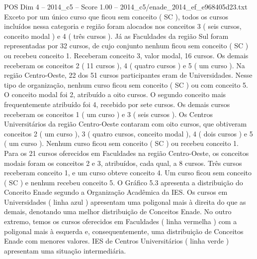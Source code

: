 \begin{textsample}{POS Dim 4 – 2014\_c5 – Score 1.00 – 2014\_c5/enade\_2014\_ef\_e968405d23.txt}
Exceto por um único curso que ficou sem conceito ( SC ), todos os cursos incluídos nessa categoria e região foram alocados nos conceitos 3 ( seis cursos, conceito modal ) e 4 ( três cursos ).
Já as Faculdades da região Sul foram representadas por 32 cursos, de cujo conjunto nenhum ficou sem conceito ( SC ) ou recebeu conceito 1.
Receberam conceito 3, valor modal, 16 cursos.
Os demais receberam os conceitos 2 ( 11 cursos ), 4 ( quatro cursos ) e 5 ( um curso ).
Na região Centro-Oeste, 22 dos 51 cursos participantes eram de Universidades.
Nesse tipo de organização, nenhum curso ficou sem conceito ( SC ) ou com conceito 5.
O conceito modal foi 2, atribuído a oito cursos.
O segundo conceito mais frequentemente atribuído foi 4, recebido por sete cursos.
Os demais cursos receberam os conceitos 1 ( um curso ) e 3 ( seis cursos ).
Os Centros Universitários da região Centro-Oeste contaram com oito cursos, que obtiveram conceitos 2 ( um curso ), 3 ( quatro cursos, conceito modal ), 4 ( dois cursos ) e 5 ( um curso ).
Nenhum curso ficou sem conceito ( SC ) ou recebeu conceito 1.
Para os 21 cursos oferecidos em Faculdades na região Centro-Oeste, os conceitos modais foram os conceitos 2 e 3, atribuídos, cada qual, a 8 cursos.
Três cursos receberam conceito 1, e um curso obteve conceito 4.
Um curso ficou sem conceito ( SC ) e nenhum recebeu conceito 5.
O Gráfico 5.3 apresenta a distribuição do Conceito Enade segundo a Organização Acadêmica da IES.
Os cursos em Universidades ( linha azul ) apresentam uma poligonal mais à direita do que as demais, denotando uma melhor distribuição de Conceitos Enade.
No outro extremo, temos os cursos oferecidos em Faculdades ( linha vermelha ) com a poligonal mais à esquerda e, consequentemente, uma distribuição de Conceitos Enade com menores valores.
IES de Centros Universitários ( linha verde ) apresentam uma situação intermediária.

\end{textsample}
